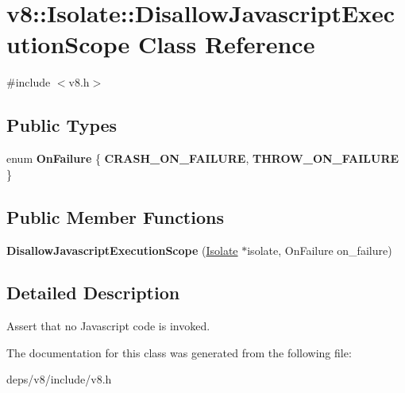 \hypertarget{classv8_1_1_isolate_1_1_disallow_javascript_execution_scope}{}\section{v8\+:\+:Isolate\+:\+:Disallow\+Javascript\+Execution\+Scope Class Reference}
\label{classv8_1_1_isolate_1_1_disallow_javascript_execution_scope}


{\ttfamily \#include $<$v8.\+h$>$}

\subsection*{Public Types}
\begin{DoxyCompactItemize}
\item 
\hypertarget{classv8_1_1_isolate_1_1_disallow_javascript_execution_scope_aeb586bef085fba34f97c09afd07ea843}{}enum {\bfseries On\+Failure} \{ {\bfseries C\+R\+A\+S\+H\+\_\+\+O\+N\+\_\+\+F\+A\+I\+L\+U\+R\+E}, 
{\bfseries T\+H\+R\+O\+W\+\_\+\+O\+N\+\_\+\+F\+A\+I\+L\+U\+R\+E}
 \}\label{classv8_1_1_isolate_1_1_disallow_javascript_execution_scope_aeb586bef085fba34f97c09afd07ea843}

\end{DoxyCompactItemize}
\subsection*{Public Member Functions}
\begin{DoxyCompactItemize}
\item 
\hypertarget{classv8_1_1_isolate_1_1_disallow_javascript_execution_scope_a64813f7832ddca3014a7b98730a13948}{}{\bfseries Disallow\+Javascript\+Execution\+Scope} (\hyperlink{classv8_1_1_isolate}{Isolate} $\ast$isolate, On\+Failure on\+\_\+failure)\label{classv8_1_1_isolate_1_1_disallow_javascript_execution_scope_a64813f7832ddca3014a7b98730a13948}

\end{DoxyCompactItemize}


\subsection{Detailed Description}
Assert that no Javascript code is invoked. 

The documentation for this class was generated from the following file\+:\begin{DoxyCompactItemize}
\item 
deps/v8/include/v8.\+h\end{DoxyCompactItemize}
